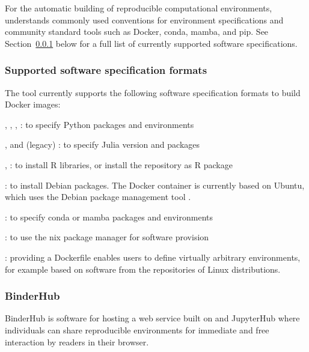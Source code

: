 For the automatic building of reproducible computational environments,
\repotodocker{} understands commonly used conventions for environment specifications and
community standard tools such as Docker, conda, mamba, and pip. See
Section~\ref{repo2docker-supported-software-specifications} below for a full list of
currently supported software specifications.

\subsubsection{Supported software specification formats}
\label{repo2docker-supported-software-specifications}
The \repotodocker{} tool currently supports the following software specification
formats to build Docker images:
\begin{compactitem}
\item {}, ,
  , : to specify Python
  packages and environments
\item {},  and (legacy)
  : to
  specify Julia version and packages
\item {}, : to install R
  libraries, or install the repository as R package
\item {}: to install Debian packages. The Docker container
  is currently based on Ubuntu, which uses the Debian package management tool .
\item {}: to specify conda or mamba packages and
  environments
\item {}: to use the nix package manager for software provision
\item {}: providing a Dockerfile enables users to define
  virtually arbitrary environments, for example based on software from the
  repositories of Linux distributions.
\end{compactitem}

\subsubsection{BinderHub}\label{sec:binderhub}
BinderHub is software for hosting a web service built on \repotodocker{} and
JupyterHub where individuals can share reproducible environments for
immediate and free interaction by readers in their browser.



